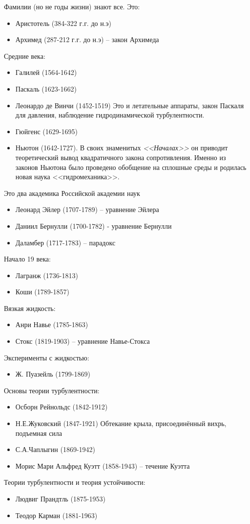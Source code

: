 Фамилии (но не годы жизни) знают все. Это:
\begin{itemize}
	\setlength\itemsep{-0.4em}
	\item Аристотель (384-322 г.г. до н.э)
	\item Архимед (287-212 г.г. до н.э) -- закон Архимеда
\end{itemize}
	Средние века:
\begin{itemize}
	\setlength\itemsep{-0.4em}
	\item Галилей (1564-1642)
	\item Паскаль (1623-1662) 
	\item Леонардо де Винчи (1452-1519)
	Это и летательные аппараты, закон Паскаля для давления, наблюдение гидродинамической турбулентности.
	\item Гюйгенс (1629-1695)
	\item Ньютон (1642-1727). В своих знаменитых \emph{<<Началах>>} он приводит теоретический вывод квадратичного закона сопротивления. Именно из законов Ньютона было проведено обобщение на сплошные среды и родилась новая наука <<гидромеханика>>.
\end{itemize}
Это два академика Российской академии наук
\begin{itemize}
	\setlength\itemsep{-0.4em}
	\item Леонард Эйлер (1707-1789) -- уравнение Эйлера
	\item Даниил Бернулли (1700-1782) -  уравнение Бернулли
	\item Даламбер (1717-1783) -- парадокс
\end{itemize}
Начало 19 века:
\begin{itemize}
	\setlength\itemsep{-0.4em}
	\item Лагранж (1736-1813)
	\item Коши (1789-1857)
\end{itemize}
Вязкая жидкость:
\begin{itemize}
	\setlength\itemsep{-0.4em}
	\item Анри Навье  (1785-1863)
	\item Стокс (1819-1903) -- уравнение Навье-Стокса
\end{itemize}
Эксперименты с жидкостью:
\begin{itemize}
	\setlength\itemsep{-0.4em}
	\item Ж. Пуазейль (1799-1869)
\end{itemize}
Основы теории турбулентности:
\begin{itemize}
	\setlength\itemsep{-0.4em}
	\item Осборн Рейнольдс (1842-1912)
	\item Н.Е.Жуковский (1847-1921) Обтекание крыла, присоединённый вихрь, подъемная сила
	\item С.А.Чаплыгин (1869-1942)
	\item Морис Мари Альфред Куэтт  (1858-1943) -- течение Куэтта
\end{itemize}
Теории турбулентности и теория устойчивости:
\begin{itemize}
	\setlength\itemsep{-0.4em}
	\item Людвиг Прандтль  (1875-1953)
	\item Теодор Карман (1881-1963)
\end{itemize}


